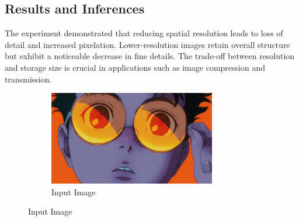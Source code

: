 \documentclass[12pt,a4paper]{article}
\begin{document}
\subsection{Results and Inferences}
The experiment demonstrated that reducing spatial resolution leads to loss of detail and increased pixelation. Lower-resolution images retain overall structure but exhibit a noticeable decrease in fine details. The trade-off between resolution and storage size is crucial in applications such as image compression and transmission.

\begin{figure}[H]
  \centering
  \begin{subfigure}[b]{\textwidth}
    \centering
    \includegraphics[width=0.8\textwidth]{spatial/spatial_reduced_100percent.jpg}
    \caption{Input Image}
  \end{subfigure}

  \vspace{2em}


\end{figure}
\end{document}

